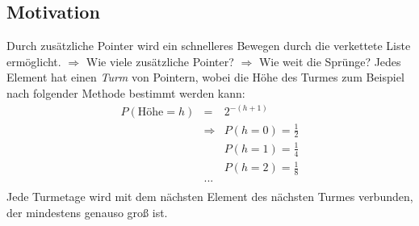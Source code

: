 \documentclass{scrartcl}%
\begin{document}
    \subsection*{Motivation}\label{subsec:motivation}
    \begin{figure}[H]
        \centering
    \end{figure}


    Durch zusätzliche Pointer wird ein schnelleres Bewegen durch die verkettete Liste ermöglicht.
    \newline $\Rightarrow$ Wie viele zusätzliche Pointer?
    \newline $\Rightarrow$ Wie weit die Sprünge?
    \newpage
    Jedes Element hat einen \textit{Turm} von Pointern, wobei die Höhe des Turmes zum Beispiel nach folgender Methode bestimmt werden kann:
    \begin{equation*}
        \begin{flalign}
            P(\text{Höhe}=h) &= & 2^{-(h+1)} \\\nonumber
            &\Rightarrow & P(h=0) = \frac{1}{2} \\\nonumber
            & & P(h=1) = \frac{1}{4} \\\nonumber
            & & P(h=2) = \frac{1}{8} \\\nonumber
            & ... &   \\\nonumber
        \end{flalign}
    \end{equation*}
    Jede Turmetage wird mit dem nächsten Element des nächsten Turmes verbunden, der mindestens genauso groß ist.
\end{document}

